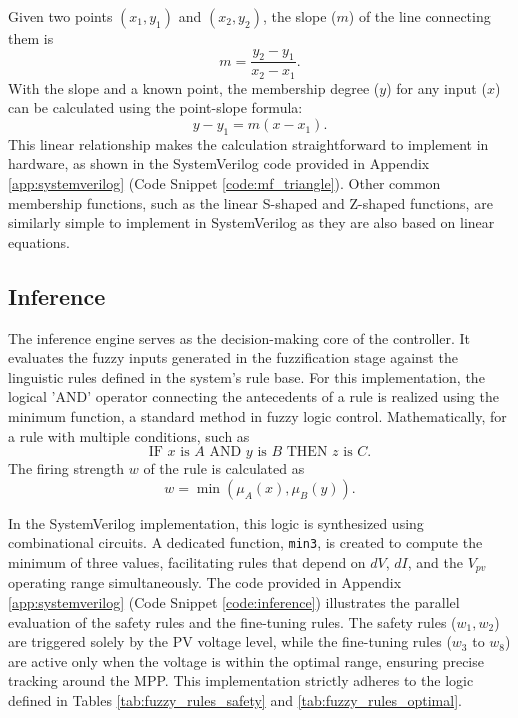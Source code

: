 \documentclass[a4paper,oneside,12pt]{report}
\numberwithin{equation}{chapter}
\begin{document}
Given two points $(x_1, y_1)$ and $(x_2, y_2)$, the slope ($m$) of the line connecting them is
\begin{equation}
    m = \frac{y_2 - y_1}{x_2 - x_1}.
\end{equation}
With the slope and a known point, the membership degree ($y$) for any input ($x$) can be calculated using the point-slope formula:
\begin{equation}
    y - y_1 = m(x - x_1).
\end{equation}
This linear relationship makes the calculation straightforward to implement in hardware, as shown in the SystemVerilog code provided in Appendix \ref{app:systemverilog} (Code Snippet \ref{code:mf_triangle}).
Other common membership functions, such as the linear S-shaped and Z-shaped functions, are similarly simple to implement in SystemVerilog as they are also based on linear equations.

\subsection{Inference}\label{sec:sv_inference}
The inference engine serves as the decision-making core of the controller. It evaluates the fuzzy inputs generated in the fuzzification stage against the linguistic rules defined in the system's rule base. For this implementation, the logical 'AND' operator connecting the antecedents of a rule is realized using the minimum function, a standard method in fuzzy logic control.
Mathematically, for a rule with multiple conditions, such as
\begin{equation}
    \text{IF } x \text{ is } A \text{ AND } y \text{ is } B \text{ THEN } z \text{ is } C.
\end{equation}
The firing strength $w$ of the rule is calculated as
\begin{equation}
    w = \min(\mu_A(x), \mu_B(y)).
\end{equation}

In the SystemVerilog implementation, this logic is synthesized using combinational circuits. A dedicated function, \texttt{min3}, is created to compute the minimum of three values, facilitating rules that depend on $dV$, $dI$, and the $V_{pv}$ operating range simultaneously. The code provided in Appendix \ref{app:systemverilog} (Code Snippet \ref{code:inference}) illustrates the parallel evaluation of the safety rules and the fine-tuning rules. The safety rules ($w_1, w_2$) are triggered solely by the PV voltage level, while the fine-tuning rules ($w_3$ to $w_8$) are active only when the voltage is within the optimal range, ensuring precise tracking around the MPP. This implementation strictly adheres to the logic defined in Tables \ref{tab:fuzzy_rules_safety} and \ref{tab:fuzzy_rules_optimal}.
\end{document}
